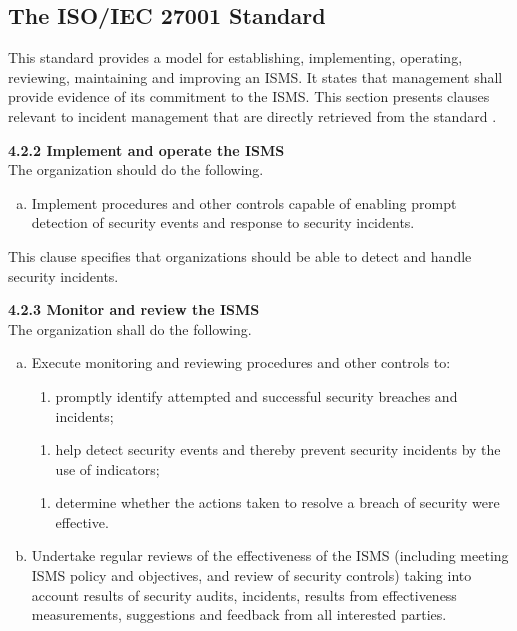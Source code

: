\subsection{The \acs{ISO}/\acs{IEC} 27001 Standard}
\label{sec:iso27001}
This standard provides a model for establishing, implementing, operating, reviewing, maintaining and improving an \ac{ISMS}. It states that management shall provide evidence of its commitment to the ISMS. This section presents clauses relevant to incident management that are directly retrieved from the standard \cite{ISO/IEC27001}. 

\textbf{4.2.2 Implement and operate the \ac{ISMS}} \\
The organization should do the following.
\begin{enumerate}[h)]
\item Implement procedures and other controls capable of enabling prompt detection of security events and response to security incidents.
\end{enumerate}

This clause specifies that organizations should be able to detect and handle security incidents.

\textbf{4.2.3 Monitor and review the ISMS}\\
The organization shall do the following.
\begin{enumerate}[a)]
\item Execute monitoring and reviewing procedures and other controls to:
\begin{enumerate}[2)]
\item promptly identify attempted and successful security breaches and incidents;
\end{enumerate}
\vspace{-0.2cm}
\begin{enumerate}[4)]
\item help detect security events and thereby prevent security incidents by the use of indicators;
\end{enumerate}
\vspace{-0.2cm}
\begin{enumerate}[5)]
\item determine whether the actions taken to resolve a breach of security were effective.
\end{enumerate}
\item Undertake regular reviews of the effectiveness of the \ac{ISMS} (including meeting \ac{ISMS} policy and objectives, and review of security controls) taking into account results of security audits, incidents, results from effectiveness measurements, suggestions and feedback from all interested parties.
\end{enumerate}

